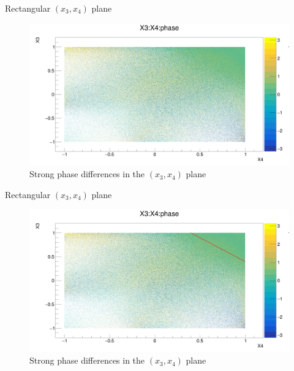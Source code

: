 \documentclass{beamer}
\begin{document}
\begin{frame}{Rectangular $(x_3, x_4)$ plane}
  \begin{figure}
    \centering
    \includegraphics[width = 1.0\textwidth]{X3X4Phase.png}
    \caption{Strong phase differences in the $(x_3, x_4)$ plane}
  \end{figure}
\end{frame}

\begin{frame}{Rectangular $(x_3, x_4)$ plane}
  \begin{figure}
    \centering
    \includegraphics[width = 1.0\textwidth]{X3X4PhaseRegion1.png}
    \caption{Strong phase differences in the $(x_3, x_4)$ plane}
  \end{figure}
\end{frame}
\end{document}
